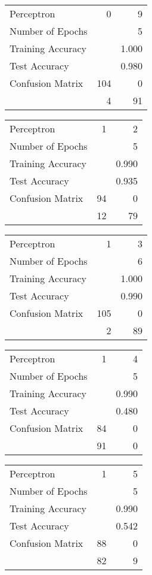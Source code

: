 \documentclass[11pt]{article}
\begin{document}
\begin{minipage}[t]{0.5\textwidth}
\begin{tabular}{|l | r r|}
\hline Perceptron & 0 & 9\\
Number of Epochs & & 5\\
Training Accuracy & & 1.000\\
Test Accuracy & & 0.980\\
Confusion Matrix & 104 & 0\\
 &4 & 91\\ \hline
\end{tabular}
\end{minipage}
\begin{minipage}[t]{0.5\textwidth}
\begin{tabular}{|l | r r|}
\hline Perceptron & 1 & 2\\
Number of Epochs & & 5\\
Training Accuracy & & 0.990\\
Test Accuracy & & 0.935\\
Confusion Matrix & 94 & 0\\
 &12 & 79\\ \hline
\end{tabular}
\end{minipage}
\begin{minipage}[t]{0.5\textwidth}
\begin{tabular}{|l | r r|}
\hline Perceptron & 1 & 3\\
Number of Epochs & & 6\\
Training Accuracy & & 1.000\\
Test Accuracy & & 0.990\\
Confusion Matrix & 105 & 0\\
 &2 & 89\\ \hline
\end{tabular}
\end{minipage}
\begin{minipage}[t]{0.5\textwidth}
\begin{tabular}{|l | r r|}
\hline Perceptron & 1 & 4\\
Number of Epochs & & 5\\
Training Accuracy & & 0.990\\
Test Accuracy & & 0.480\\
Confusion Matrix & 84 & 0\\
 &91 & 0\\ \hline
\end{tabular}
\end{minipage}
\begin{minipage}[t]{0.5\textwidth}
\begin{tabular}{|l | r r|}
\hline Perceptron & 1 & 5\\
Number of Epochs & & 5\\
Training Accuracy & & 0.990\\
Test Accuracy & & 0.542\\
Confusion Matrix & 88 & 0\\
 &82 & 9\\ \hline
\end{tabular}
\end{minipage}
\end{document}

